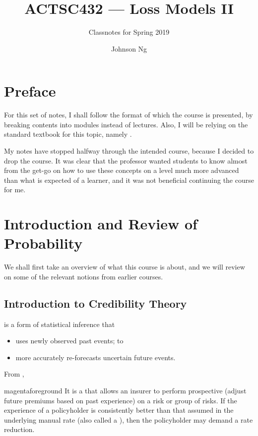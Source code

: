 \documentclass[notoc,notitlepage]{tufte-book}
\title{ACTSC432 --- Loss Models II}
\author{Johnson Ng}
\subtitle{Classnotes for Spring 2019}
\begin{document}


\chapter*{Preface}%
\label{chp:preface}

For this set of notes, I shall follow the format of which the course is
presented, by breaking contents into modules instead of lectures. Also, I will
be relying on the standard textbook for this topic, namely
\citealt{klugman2012}.

\begin{warning}
  My notes have stopped halfway through the intended course,
  because I decided to drop the course.
  It was clear that the professor wanted students to know
  almost from the get-go on how to use these concepts on a
  level much more advanced than what is expected of a learner,
  and it was not beneficial continuing the course for me.
\end{warning}


\label{part:pre_requiresite_review}

\chapter{Introduction and Review of Probability}%
\label{chp:introduction_and_review_of_probability}

We shall first take an overview of what this course is about, and we will review
on some of the relevant notions from earlier courses.

\section{Introduction to Credibility Theory}%
\label{sec:introduction_to_credibility_theory}

 is a form of statistical inference that
\begin{itemize}
  \item uses newly observed past events; to
  \item more accurately re-forecasts uncertain future events.
\end{itemize}
From \citealt{klugman2012},
\begin{quotebox}{magenta}{foreground}
  It is a  that allows an insurer to perform
  prospective  (adjust future premiums based
  on past experience) on a risk or group of risks. If the experience of a
  policyholder is consistently better than that assumed in the underlying manual
  rate (also called a ), then the policyholder may demand
  a rate reduction.
\end{quotebox}
\end{document}
